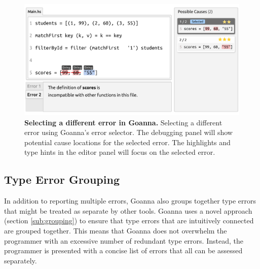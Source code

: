 \documentclass[pdflatex,lineno,sn-nature,Numbered]{sn-jnl}%
\begin{document}
    \begin{figure}[ht!]
        \centering
        \includegraphics[width=\linewidth]{images/goanna-multi-error}
        \caption[Selecting a different error in Goanna]{\textbf{Selecting a different error in Goanna.} Selecting a different error using Goanna's error selector. The debugging panel will show potential cause locations for the selected error. The highlights and type hints in the editor panel will focus on the selected error.}
        \label{fig:multi-error}
    \end{figure}



    \subsection{Type Error Grouping}  \label{sub:group}
    In addition to reporting multiple errors, Goanna also groups together type errors that might be treated as separate by other tools. Goanna uses a novel approach (section \ref{sub:grouping}) to ensure that type errors that are intuitively connected are grouped together. This means that Goanna does not overwhelm the programmer with an excessive number of redundant type errors. Instead, the programmer is presented with a concise list of errors that all can be assessed separately.
\end{document}

